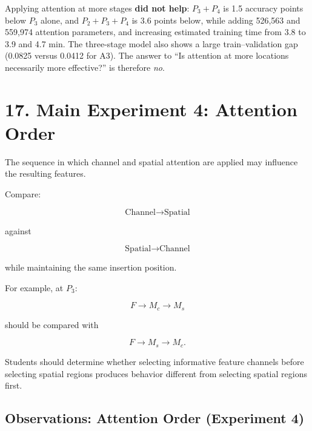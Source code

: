 \documentclass[10pt]{article}
\begin{document}
Applying attention at more stages \textbf{did not help}: $P_3{+}P_4$ is 1.5 accuracy points below $P_3$ alone, and $P_2{+}P_3{+}P_4$ is 3.6 points below, while adding 526{,}563 and 559{,}974 attention parameters, and increasing estimated training time from 3.8 to 3.9 and 4.7 min. The three-stage model also shows a large train--validation gap (0.0825 versus 0.0412 for A3). The answer to ``Is attention at more locations necessarily more effective?'' is therefore \emph{no}.

\section*{17. Main Experiment 4: Attention Order}

The sequence in which channel and spatial attention are applied may influence
the resulting features.

Compare:

\[
\boxed{
\text{Channel}
\rightarrow
\text{Spatial}
}
\]

against

\[
\boxed{
\text{Spatial}
\rightarrow
\text{Channel}
}
\]

while maintaining the same insertion position.

For example, at $P_3$:

\[
F
\rightarrow
M_c
\rightarrow
M_s
\]

should be compared with

\[
F
\rightarrow
M_s
\rightarrow
M_c.
\]

Students should determine whether selecting informative feature channels
before selecting spatial regions produces behavior different from selecting
spatial regions first.


\subsection*{Observations: Attention Order (Experiment 4)}
\begin{table}[H]
\centering
\caption{Experiment 4 -- attention order at $P_3$.}
\scriptsize
{}
\end{table}
\end{document}
